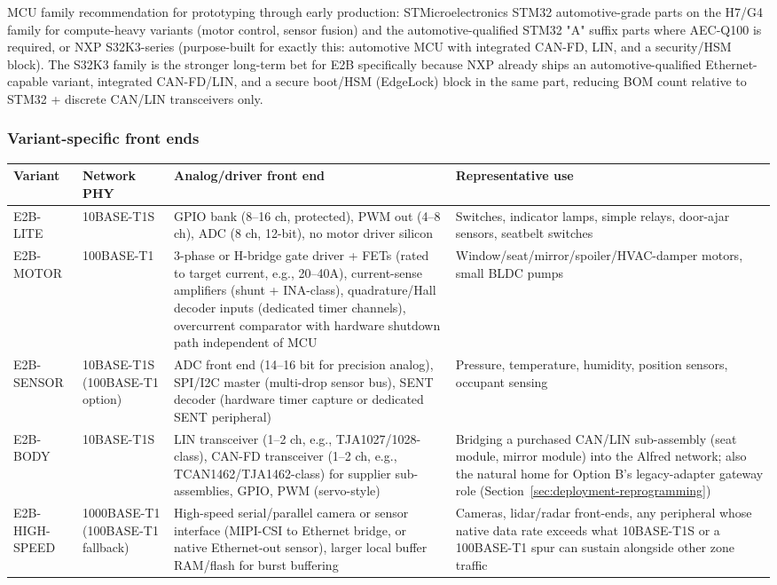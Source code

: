 MCU family recommendation for prototyping through early production: STMicroelectronics STM32 automotive-grade parts on the H7/G4 family for compute-heavy variants (motor control, sensor fusion) and the automotive-qualified STM32 "A" suffix parts where AEC-Q100 is required, or NXP S32K3-series (purpose-built for exactly this: automotive MCU with integrated CAN-FD, LIN, and a security/HSM block). The S32K3 family is the stronger long-term bet for E2B specifically because NXP already ships an automotive-qualified Ethernet-capable variant, integrated CAN-FD/LIN, and a secure boot/HSM (EdgeLock) block in the same part, reducing BOM count relative to STM32 + discrete CAN/LIN transceivers only.

\subsubsection{Variant-specific front ends}

\begin{center}
\small
\begin{tabularx}{\linewidth}{@{}p{2.1cm} p{2.3cm} X X@{}}
\toprule
\textbf{Variant} & \textbf{Network PHY} & \textbf{Analog/driver front end} & \textbf{Representative use} \\
\midrule
E2B-LITE & 10BASE-T1S & GPIO bank (8--16 ch, protected), PWM out (4--8 ch), ADC (8 ch, 12-bit), no motor driver silicon & Switches, indicator lamps, simple relays, door-ajar sensors, seatbelt switches \\
E2B-MOTOR & 100BASE-T1 & 3-phase or H-bridge gate driver + FETs (rated to target current, e.g., 20--40A), current-sense amplifiers (shunt + INA-class), quadrature/Hall decoder inputs (dedicated timer channels), overcurrent comparator with hardware shutdown path independent of MCU & Window/seat/mirror/spoiler/HVAC-damper motors, small BLDC pumps \\
E2B-SENSOR & 10BASE-T1S (100BASE-T1 option) & ADC front end (14--16 bit for precision analog), SPI/I2C master (multi-drop sensor bus), SENT decoder (hardware timer capture or dedicated SENT peripheral) & Pressure, temperature, humidity, position sensors, occupant sensing \\
E2B-BODY & 10BASE-T1S & LIN transceiver (1--2 ch, e.g., TJA1027/1028-class), CAN-FD transceiver (1--2 ch, e.g., TCAN1462/TJA1462-class) for supplier sub-assemblies, GPIO, PWM (servo-style) & Bridging a purchased CAN/LIN sub-assembly (seat module, mirror module) into the Alfred network; also the natural home for Option B's legacy-adapter gateway role (Section~\ref{sec:deployment-reprogramming}) \\
E2B-HIGH-SPEED & 1000BASE-T1 (100BASE-T1 fallback) & High-speed serial/parallel camera or sensor interface (MIPI-CSI to Ethernet bridge, or native Ethernet-out sensor), larger local buffer RAM/flash for burst buffering & Cameras, lidar/radar front-ends, any peripheral whose native data rate exceeds what 10BASE-T1S or a 100BASE-T1 spur can sustain alongside other zone traffic \\
\bottomrule
\end{tabularx}
\end{center}


